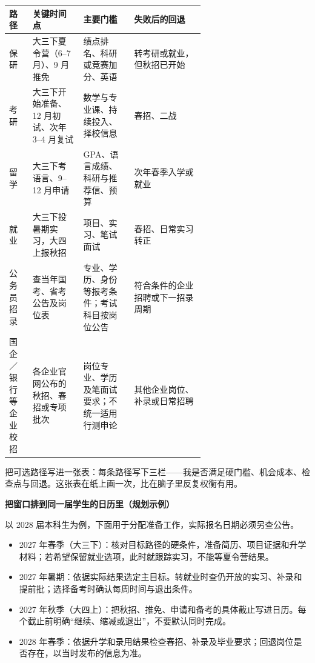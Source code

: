 \documentclass[UTF8,zihao=5,openany]{ctexbook}
\begin{document}
\begin{center}\small
\begin{tabularx}{\linewidth}{p{0.12\linewidth}p{0.26\linewidth}p{0.26\linewidth}Y}
\toprule
路径 & 关键时间点 & 主要门槛 & 失败后的回退 \\
\midrule
保研 & 大三下夏令营（6--7 月）、9 月推免 & 绩点排名、科研或竞赛加分、英语 & 转考研或就业，但秋招已开始 \\
考研 & 大三下开始准备、12 月初试、次年 3--4 月复试 & 数学与专业课、持续投入、择校信息 & 春招、二战 \\
留学 & 大三下考语言、9--12 月申请 & GPA、语言成绩、科研与推荐信、预算 & 次年春季入学或就业 \\
就业 & 大三下投暑期实习，大四上报秋招 & 项目、实习、笔试面试 & 春招、日常实习转正 \\
公务员招录 & 查当年国考、省考公告及岗位表 & 专业、学历、身份等报考条件；考试科目按岗位公告 & 符合条件的企业招聘或下一招录周期 \\
国企／银行等企业校招 & 各企业官网公布的秋招、春招或专项批次 & 岗位专业、学历及笔面试要求；不统一适用行测申论 & 其他企业岗位、补录或日常招聘 \\
\bottomrule
\end{tabularx}
\end{center}

把可选路径写进一张表：每条路径写下三栏——我是否满足硬门槛、机会成本、检查点与回退。这张表在纸上画一次，比在脑子里反复权衡有用。




\begin{toolbox}
\textbf{把窗口排到同一届学生的日历里（规划示例）}

以 2028 届本科生为例，下面用于分配准备工作，实际报名日期必须另查公告。
\begin{itemize}
\item 2027 年春季（大三下）：核对目标路径的硬条件，准备简历、项目证据和升学材料；若希望保留就业选项，此时就跟踪实习，不能等夏令营结果。
\item 2027 年暑期：依据实际结果选定主目标。转就业时查仍开放的实习、补录和提前批；选择备考时确认每周时间与退出条件。
\item 2027 年秋季（大四上）：把秋招、推免、申请和备考的具体截止写进日历。每个截止前明确“继续、缩减或退出”，不要默认同时完成。
\item 2028 年春季：依据升学和录用结果检查春招、补录及毕业要求；回退岗位是否存在，以当时发布的信息为准。
\end{itemize}
\end{toolbox}
\end{document}
